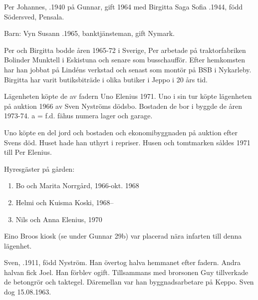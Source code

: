 
%
Per Johannes, .1940 på Gunnar, gift 1964 med Birgitta Saga Sofia .1944, född Södersved, Pensala.

Barn: Vyn Susann .1965, banktjänsteman, gift Nymark.

Per och Birgitta bodde åren 1965-72 i Sverige, Per arbetade på traktorfabriken Bolinder Munktell i Eskistuna och senare som busschaufför. Efter hemkomsten har han jobbat på Lindéns verkstad och senast som montör på BSB i Nykarleby. Birgitta har varit butiksbiträde i olika butiker i Jeppo i 20 års tid.

Lägenheten köpte de av fadern Uno Elenius 1971. Uno i sin tur köpte lägenheten på auktion 1966 av Sven Nyströms dödsbo. Bostaden de bor i byggde de åren 1973-74.  a = f.d. fähus numera lager och garage.



%



%
Uno köpte en del jord och bostaden och ekonomibyggnaden på auktion efter Svens död. Huset hade han uthyrt i repriser. Husen och tomtmarken såldes 1971 till Per Elenius.

Hyresgäster på gården:
\begin{enumerate}
  \item Bo och Marita Norrgård, 1966-okt. 1968
  \item Helmi och Kuisma Koski, 1968--
  \item Nils och Anna  Elenius, 1970
\end{enumerate}
Eino Broos kiosk (se under Gunnar 29b) var placerad nära infarten till denna lägenhet.

%
Sven, .1911, född Nyström. Han övertog halva hemmanet efter fadern. Andra halvan fick Joel. Han förblev ogift. Tillsammans med brorsonen Guy tillverkade de betongrör och taktegel. Däremellan var han byggnadsarbetare på Keppo. Sven dog 15.08.1963.\jhvspace{}


